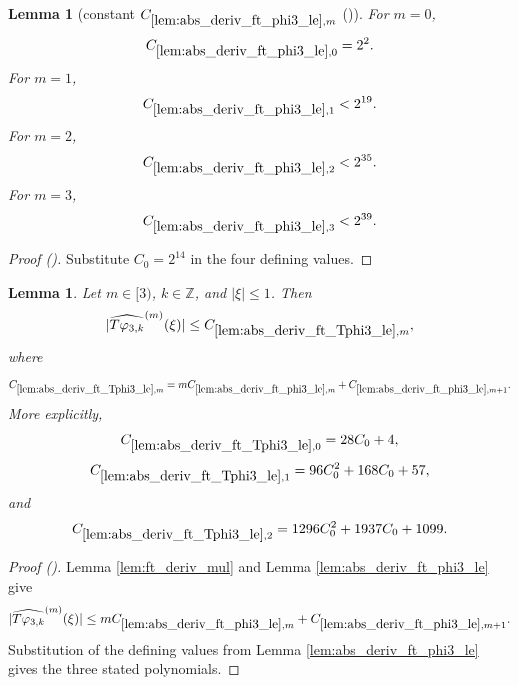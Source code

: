 \documentclass[12pt,reqno]{amsart}
\newcommand{\auto}{{({\tiny\faCar})}}
\theoremstyle{plain}
\newtheorem{lemma}[theorem]{Lemma}
\numberwithin{equation}{section}
\theoremstyle{remark}
\newcommand{\using}[1]{}
\newcommand{\Z}{{\mathbb Z}}
\begin{document}
\begin{lemma}[constant $C_{\ref{lem:abs_deriv_ft_phi3_le},m}$ \auto]\label{constant phi three derivative}\using{lem:abs_deriv_ft_phi3_le}
For $m=0$,
\begin{equation}\label{constant phi three derivative bound}
C_{\ref{lem:abs_deriv_ft_phi3_le},0}=2^2.
\end{equation}
For $m=1$,
\begin{equation}\label{auto:constant-phi-three-derivative-one}
C_{\ref{lem:abs_deriv_ft_phi3_le},1}<2^{19}.
\end{equation}
For $m=2$,
\begin{equation}\label{auto:constant-phi-three-derivative-two}
C_{\ref{lem:abs_deriv_ft_phi3_le},2}<2^{35}.
\end{equation}
For $m=3$,
\begin{equation}\label{auto:constant-phi-three-derivative-three}
C_{\ref{lem:abs_deriv_ft_phi3_le},3}<2^{39}.
\end{equation}
\end{lemma}
\begin{proof}[Proof \auto]
Substitute $C_0=2^{14}$ in the four defining values.
\end{proof}

\begin{lemma}\label{lem:abs_deriv_ft_Tphi3_le}\using{lem:ft_deriv_mul}\using{lem:abs_deriv_ft_phi3_le}
Let $m\in[3)$, $k\in\Z$, and $|\xi|\le1$. Then
\begin{equation}\label{auto:T-varphi-three-Fourier-derivative-bound}
|\widehat{T\varphi_{3,k}}^{(m)}(\xi)|
\le C_{\ref{lem:abs_deriv_ft_Tphi3_le},m},
\end{equation}
where
\begin{equation}\label{auto:T-varphi-three-Fourier-derivative-constant}
C_{\ref{lem:abs_deriv_ft_Tphi3_le},m}
=mC_{\ref{lem:abs_deriv_ft_phi3_le},m}
+C_{\ref{lem:abs_deriv_ft_phi3_le},m+1}.
\end{equation}
More explicitly,
\begin{equation}\label{auto:T-varphi-three-Fourier-derivative-constant-zero-exact}
C_{\ref{lem:abs_deriv_ft_Tphi3_le},0}=28C_0+4,
\end{equation}
\begin{equation}\label{auto:T-varphi-three-Fourier-derivative-constant-one-exact}
C_{\ref{lem:abs_deriv_ft_Tphi3_le},1}=96C_0^2+168C_0+57,
\end{equation}
and
\begin{equation}\label{auto:T-varphi-three-Fourier-derivative-constant-two-exact}
C_{\ref{lem:abs_deriv_ft_Tphi3_le},2}=1296C_0^2+1937C_0+1099.
\end{equation}
\end{lemma}
\begin{proof}[Proof \auto]
Lemma \ref{lem:ft_deriv_mul} and Lemma \ref{lem:abs_deriv_ft_phi3_le} give
\[
|\widehat{T\varphi_{3,k}}^{(m)}(\xi)|
\le
mC_{\ref{lem:abs_deriv_ft_phi3_le},m}
+C_{\ref{lem:abs_deriv_ft_phi3_le},m+1}.
\]
Substitution of the defining values from Lemma \ref{lem:abs_deriv_ft_phi3_le} gives the three stated polynomials.
\end{proof}
\end{document}
